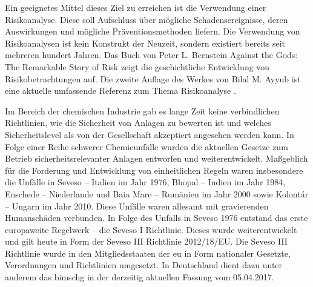Ein geeignetes Mittel dieses Ziel zu erreichen ist die Verwendung einer Risikoanalyse. Diese soll Aufschluss \"uber m\"ogliche Schadensereignisse, deren Auswirkungen und m\"ogliche Pr\"aventionsmethoden liefern. Die Verwendung von Risikoanalysen ist kein Konstrukt der Neuzeit, sondern existiert bereits seit mehreren hundert Jahren. Das Buch von Peter L. Bernstein \glqq Against the Gods: The Remarkable Story of Risk\grqq { } \cite{Bernstein_1998} zeigt die geschichtliche Entwicklung von Risikobetrachtungen auf. Die zweite Auflage des Werkes von Bilal M. Ayyub ist eine aktuelle umfassende Referenz zum Thema Risikoanalyse \cite{Ayyub_2014}.

Im Bereich der chemischen Industrie gab es lange Zeit keine verbindlichen Richtlinien, wie die Sicherheit von Anlagen zu bewerten ist und welches Sicherheitslevel als von der Gesellschaft akzeptiert angesehen werden kann. In Folge einer Reihe schwerer Chemieunf\"alle wurden die aktuellen Gesetze zum Betrieb sicherheitsrelevanter Anlagen entworfen und weiterentwickelt.\newline
Ma\ss{}geblich f\"ur die Forderung und Entwicklung von einheitlichen Regeln waren insbesondere die Unf\"alle in Seveso -- Italien im Jahr 1976, Bhopal -- Indien im Jahr 1984, Enschede -- Niederlande und Baia Mare -- Rum\"anien im Jahr 2000 sowie Kolont\'ar -- Ungarn im Jahr 2010. Diese Unf\"alle waren allesamt mit gravierenden Humansch\"aden verbunden. In Folge des Unfalls in Seveso 1976 entstand das erste europaweite Regelwerk -- die {Seveso I} Richtlinie. Dieses  wurde weiterentwickelt und gilt heute in Form der {Seveso III} Richtlinie 2012/18/EU. Die {Seveso III} Richtlinie wurde in den Mitgliedsstaaten der \ac{eu} in Form nationaler Gesetzte, Verordnungen und Richtlinien umgesetzt. In Deutschland dient dazu unter anderem das \ac{bimschg} in der derzeitig aktuellen Fassung vom 05.04.2017.

